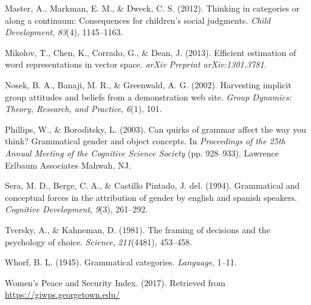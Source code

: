 \documentclass[10pt, letterpaper]{article}
\begin{document}
\hypertarget{ref-master2012thinking}{}
Master, A., Markman, E. M., \& Dweck, C. S. (2012). Thinking in
categories or along a continuum: Consequences for children's social
judgments. \emph{Child Development}, \emph{83}(4), 1145--1163.

\hypertarget{ref-mikolov2013efficient}{}
Mikolov, T., Chen, K., Corrado, G., \& Dean, J. (2013). Efficient
estimation of word representations in vector space. \emph{arXiv Preprint
arXiv:1301.3781}.

\hypertarget{ref-nosek2002harvesting}{}
Nosek, B. A., Banaji, M. R., \& Greenwald, A. G. (2002). Harvesting
implicit group attitudes and beliefs from a demonstration web site.
\emph{Group Dynamics: Theory, Research, and Practice}, \emph{6}(1), 101.

\hypertarget{ref-phillips2003can}{}
Phillips, W., \& Boroditsky, L. (2003). Can quirks of grammar affect the
way you think? Grammatical gender and object concepts. In
\emph{Proceedings of the 25th Annual Meeting of the Cognitive Science
Society} (pp. 928--933). Lawrence Erlbaum Associates Mahwah, NJ.

\hypertarget{ref-sera1994grammatical}{}
Sera, M. D., Berge, C. A., \& Castillo Pintado, J. del. (1994).
Grammatical and conceptual forces in the attribution of gender by
english and spanish speakers. \emph{Cognitive Development}, \emph{9}(3),
261--292.

\hypertarget{ref-tversky1981framing}{}
Tversky, A., \& Kahneman, D. (1981). The framing of decisions and the
psychology of choice. \emph{Science}, \emph{211}(4481), 453--458.

\hypertarget{ref-whorf1945grammatical}{}
Whorf, B. L. (1945). Grammatical categories. \emph{Language}, 1--11.

\hypertarget{ref-wps}{}
Women's Peace and Security Index. (2017). Retrieved from
\url{https://giwps.georgetown.edu/}
\end{document}
